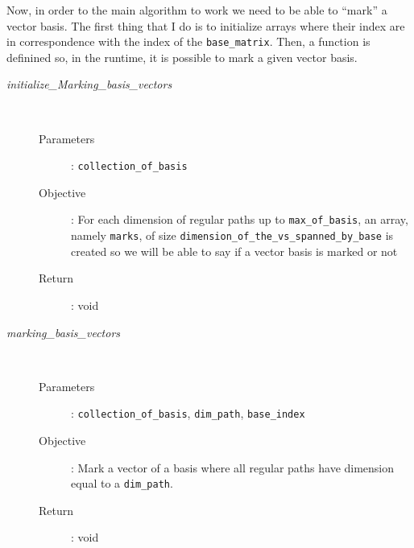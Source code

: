 \documentclass[11pt,a4paper]{article}
\begin{document}
Now, in order to the main algorithm to work we need to be able to ``mark'' a vector
basis. The first thing that I do is to initialize arrays where their index are in correspondence
with the index of the \texttt{base\_matrix}. Then, a function is definined so, in the runtime,
it is possible to mark a given vector basis.
\begin{description}
	\item [\textit{initialize\_Marking\_basis\_vectors}] \hfill \\[-0.5cm]
		\begin{description}
			\item [Parameters]: \texttt{collection\_of\_basis}
			\item [Objective]: For each dimension of regular paths up to
				\texttt{max\_of\_basis}, an array, namely \texttt{marks},
				of size \texttt{dimension\_of\_the\_vs\_spanned\_by\_base}
				is created so we will be able to say if a vector basis
				is marked or not
			\item [Return]: void
		\end{description}
	\item [\textit{marking\_basis\_vectors}] \hfill \\[-0.5cm]
		\begin{description}
			\item [Parameters]: \texttt{collection\_of\_basis}, \texttt{dim\_path},
				\texttt{base\_index}
			\item [Objective]: Mark a vector of a basis where all regular paths
				have dimension equal to a \texttt{dim\_path}.
			\item [Return]: void
		\end{description}
\end{description}
\end{document}

